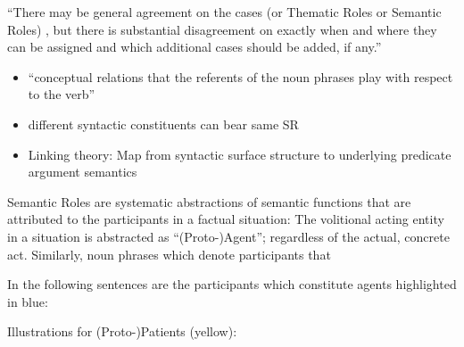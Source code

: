 ``There may be general agreement on the cases (or Thematic Roles or Semantic Roles) \textelp{},
but there is substantial disagreement on exactly when and where they can be assigned and which
additional cases should be added, if any.'' \citep{palmer2010semantic}



\begin{itemize}
  \item ``conceptual relations that the referents of the noun phrases play with respect to the verb'' \citep{palmer2010semantic}
  \item different syntactic constituents can bear same SR
  \item Linking theory: Map from syntactic surface structure to underlying predicate argument semantics
\end{itemize}


Semantic Roles are systematic abstractions of semantic functions that are attributed to the participants
in a factual situation: The volitional acting entity in a situation is abstracted as ``(Proto-)Agent''; regardless
of the actual, concrete act. Similarly, noun phrases which denote participants that

In the following sentences are the participants which constitute agents highlighted in
blue:


Illustrations for (Proto-)Patients (yellow):

